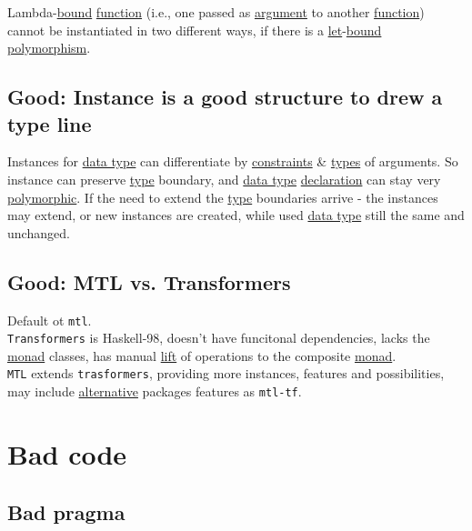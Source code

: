 \documentclass[11pt]{article}
\begin{document}
Lambda-\hyperref[orgaac83d9]{bound} \hyperref[orge15bc14]{function} (i.e., one passed as \hyperref[orga6b7e97]{argument} to another \hyperref[orge15bc14]{function}) cannot be instantiated in two different ways, if there is a \hyperref[org77c82c3]{let}-\hyperref[orgaac83d9]{bound} \hyperref[org64df340]{polymorphism}.\\


\subsection{\label{org61bf353}Good: Instance is a good structure to drew a type line}
\label{sec:org3939285}

Instances for \hyperref[org212d9c3]{data type} can differentiate by \hyperref[orgcddf7a9]{constraints} \& \hyperref[org4209edd]{types} of arguments. So instance can preserve \hyperref[orgc4aea2f]{type} boundary, and \hyperref[org212d9c3]{data type} \hyperref[org8fbd848]{declaration} can stay very \hyperref[orgac4d581]{polymorphic}. If the need to extend the \hyperref[orgc4aea2f]{type} boundaries arrive - the instances may extend, or new instances are created, while used \hyperref[org212d9c3]{data type} still the same and unchanged.\\

\subsection{\label{orgf04f526}Good: MTL vs. Transformers}
\label{sec:org9418e03}
Default ot \texttt{mtl}.\\

\texttt{Transformers} is Haskell-98, doesn't have funcitonal dependencies, lacks the \hyperref[org86a5d95]{monad} classes, has manual \hyperref[org47dee33]{lift} of operations to the composite \hyperref[org86a5d95]{monad}.\\

\texttt{MTL} extends \texttt{trasformers}, providing more instances, features and possibilities, may include \hyperref[orgabbc1e9]{alternative} packages features as \texttt{mtl-tf}.\\

\section{Bad code}
\label{sec:org1aef9fd}
\subsection{\label{orgd8bd01d}Bad pragma}
\label{sec:org4328d08}
\end{document}

